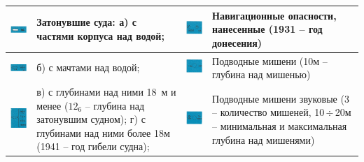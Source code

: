 \documentclass[a4paper, 12pt, twoside, final, book, russian, fittopage, cyremdash]{ncc}
\newcommand{\otdo}{\,\ensuremath{\div}\,}
\begin{document}
\small
\begin{longtable}{M|m{0.2\textwidth}|M|m{0.2\textwidth}}
  \toprule
  \includegraphics[scale=1.3]{APP-2-A-18} & Затонувшие суда: \newline а) с частями корпуса над водой; &
  \includegraphics[scale=1.3]{APP-2-A-26} & Навигационные опасности, нанесенные (1931 \--- год донесения) \\
  \midrule
  \includegraphics[scale=1.3]{APP-2-A-19} & б) с мачтами над водой; &
  \includegraphics[scale=1.3]{APP-2-A-27} & Подводные мишени (10м \--- глубина над мишенью) \\
  \midrule
  \includegraphics[scale=1.3]{APP-2-A-20} & в) с глубинами над ними 18~м и менее ($12_6$ \--- глубина над затонувшим судном); \newline г) с глубинами над ними более 18м (1941 \--- год гибели судна); &
  \includegraphics[scale=1.3]{APP-2-A-28} & Подводные мишени звуковые (3 \--- количество мишеней, 10\otdo 20м \--- минимальная и максимальная глубина над мишенями) \\

\end{longtable}
\end{document}
